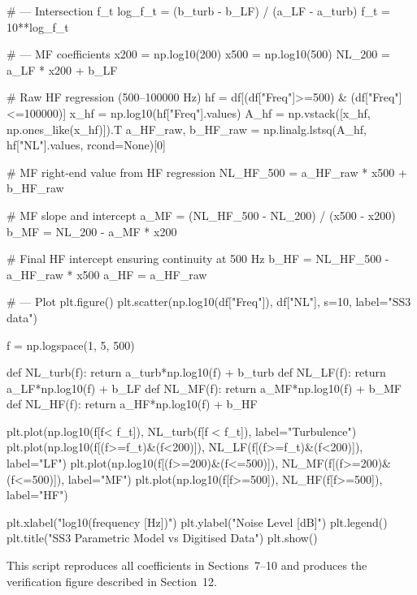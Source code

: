 \documentclass[12pt]{article}
\begin{document}
\# --- Intersection f_t
log_f_t = (b_turb - b_LF) / (a_LF - a_turb)
f_t = 10**log_f_t

\# --- MF coefficients
x200 = np.log10(200)
x500 = np.log10(500)
NL_200 = a_LF * x200 + b_LF

\# Raw HF regression (500--100000 Hz)
hf = df[(df["Freq"]>=500) \& (df["Freq"]<=100000)]
x_hf = np.log10(hf["Freq"].values)
A_hf = np.vstack([x_hf, np.ones_like(x_hf)]).T
a_HF_raw, b_HF_raw = np.linalg.lstsq(A_hf, hf["NL"].values, rcond=None)[0]

\# MF right-end value from HF regression
NL_HF_500 = a_HF_raw * x500 + b_HF_raw

\# MF slope and intercept
a_MF = (NL_HF_500 - NL_200) / (x500 - x200)
b_MF = NL_200 - a_MF * x200

\# Final HF intercept ensuring continuity at 500 Hz
b_HF = NL_HF_500 - a_HF_raw * x500
a_HF = a_HF_raw

\# --- Plot
plt.figure()
plt.scatter(np.log10(df["Freq"]), df["NL"], s=10, label="SS3 data")

f = np.logspace(1, 5, 500)

def NL_turb(f): return a_turb*np.log10(f) + b_turb
def NL_LF(f):   return a_LF*np.log10(f) + b_LF
def NL_MF(f):   return a_MF*np.log10(f) + b_MF
def NL_HF(f):   return a_HF*np.log10(f) + b_HF

plt.plot(np.log10(f[f< f_t]), NL_turb(f[f < f_t]), label="Turbulence")
plt.plot(np.log10(f[(f>=f_t)\&(f<200)]), NL_LF(f[(f>=f_t)\&(f<200)]), label="LF")
plt.plot(np.log10(f[(f>=200)\&(f<=500)]), NL_MF(f[(f>=200)\&(f<=500)]), label="MF")
plt.plot(np.log10(f[f>=500]), NL_HF(f[f>=500]), label="HF")

plt.xlabel("log10(frequency [Hz])")
plt.ylabel("Noise Level [dB]")
plt.legend()
plt.title("SS3 Parametric Model vs Digitised Data")
plt.show()

This script reproduces all coefficients in Sections 7–10 and produces the verification figure described in Section 12.
\end{document}
